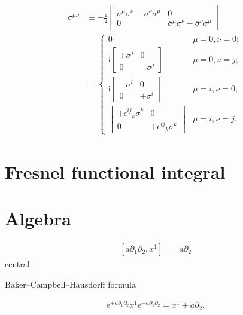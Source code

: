 \documentclass[12pt]{article}
\newcommand\mi{\mathrm{i}} %
\newcommand\me{\mathrm{e}} %
\newcommand{\sbr}[1]{{\left[#1\right]}}
\begin{document}
\begin{align}
\sigma^{\mu\nu} &\equiv -\frac{\mi}{2}
\begin{bmatrix}
\sigma^\mu\bar\sigma^\nu-\sigma^\nu\bar\sigma^\mu & 0 \\
0 & \bar\sigma^\mu\sigma^\nu-\bar\sigma^\nu\sigma^\mu
\end{bmatrix} \nonumber \\
&=
\begin{cases}
0 & \mu = 0, \nu = 0; \\
\mi \begin{bmatrix}+\sigma^j & 0 \\ 0 & -\sigma^j\end{bmatrix}
& \mu = 0, \nu = j; \\
\mi \begin{bmatrix}-\sigma^i & 0 \\ 0 & +\sigma^i\end{bmatrix}
& \mu = i, \nu = 0; \\
\begin{bmatrix}
+\epsilon^{ij}{}_k \sigma^k & 0
\\ 0 & +\epsilon^{ij}{}_k \sigma^k\end{bmatrix}
& \mu = i, \nu = j.
\end{cases}
\end{align}


\section{Fresnel functional integral}

\citep[ch.~10]{mosel2004}

\section{Algebra}
\begin{align}
\sbr{a\partial_1 \partial_2, x^1}_- = a\partial_2
\end{align}
central.

Baker--Campbell--Hausdorff formula

\begin{align}
\me^{+a\partial_1\partial_2} x^1 \me^{-a\partial_1\partial_2}
= x^1 + a \partial_2.
\end{align}




\end{document}
